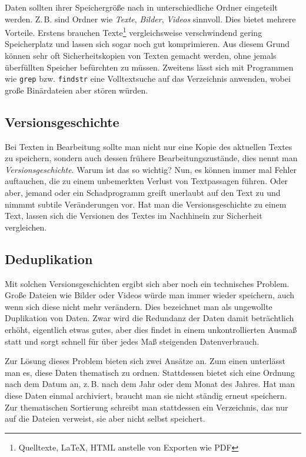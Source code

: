 \documentclass[a4paper,11pt,fleqn,twocolumn,twoside]{scrartcl}
\begin{document}
Daten sollten ihrer Speichergröße nach in unterschiedliche Ordner
eingeteilt werden. Z.\,B. sind Ordner wie \emph{Texte}, \emph{Bilder},
\emph{Videos} sinnvoll. Dies bietet mehrere Vorteile. Erstens brauchen
Texte\footnote{Quelltexte, LaTeX, HTML anstelle von Exporten wie PDF}
vergleichsweise verschwindend gering Speicherplatz und lassen
sich sogar noch gut komprimieren. Aus diesem Grund können sehr oft
Sicherheitskopien von Texten gemacht werden, ohne jemals
überfüllten Speicher befürchten zu müssen. Zweitens lässt sich mit
Programmen wie \texttt{grep} bzw. \texttt{findstr} eine Volltextsuche
auf das Verzeichnis anwenden, wobei große Binärdateien aber stören
würden.

\subsection{Versionsgeschichte}

Bei Texten in Bearbeitung sollte man nicht nur eine Kopie
des aktuellen Textes zu speichern, sondern auch dessen frühere
Bearbeitungszustände, dies nennt man
\emph{Versionsgeschichte}. Warum ist das so wichtig?
Nun, es können immer mal Fehler auftauchen, die zu einem
unbemerkten Verlust von Textpassagen führen. Oder aber, jemand
oder ein Schadprogramm greift unerlaubt auf den Text zu und nimmmt
subtile Veränderungen vor. Hat man die Versionsgeschichte zu einem
Text, lassen sich die Versionen des Textes im Nachhinein zur Sicherheit
vergleichen.

\subsection{Deduplikation}

Mit solchen Versionsgeschichten ergibt sich aber noch ein technisches
Problem. Große Dateien wie Bilder oder Videos würde man immer
wieder speichern, auch wenn sich diese nicht mehr verändern.
Dies bezeichnet man als ungewollte Duplikation von Daten.
Zwar wird die Redundanz der Daten damit beträchtlich erhöht,
eigentlich etwas gutes, aber dies findet in einem unkontrollierten
Ausmaß statt und sorgt schnell für über jedes Maß
steigenden Datenverbrauch.

Zur Lösung dieses Problem bieten sich zwei Ansätze an.
Zum einen unterlässt man es, diese Daten thematisch zu ordnen.
Stattdessen bietet sich eine Ordnung nach dem Datum an, z.\,B.
nach dem Jahr oder dem Monat des Jahres. Hat man diese Daten
einmal archiviert, braucht man sie nicht ständig erneut speichern.
Zur thematischen Sortierung schreibt man stattdessen ein Verzeichnis,
das nur auf die Dateien verweist, sie aber nicht selbst speichert.
\end{document}
